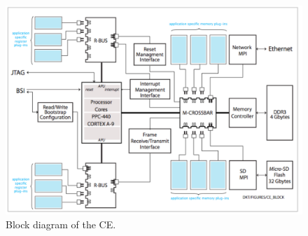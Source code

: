 \begin{figure}[tbh]
\includegraphics[scale=0.8]{ce-block.pdf}
\caption{Block diagram of the CE.}
\label{fig:CEblock}
\end{figure} 


